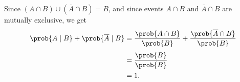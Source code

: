 Since $(A\cap B)\cup(\overline{A}\cap B)=B$, and since events $A\cap B$ and $\overline{A}\cap B$ are mutually exclusive, we get
\begin{align*}
    \prob{A\mid B}+\prob{\overline{A}\mid B} &= \frac{\prob{A\cap B}}{\prob{B}}+\frac{\prob{\overline{A}\cap B}}{\prob{B}} \\[1mm]
    &= \frac{\prob{B}}{\prob{B}} \\
    &= 1.
\end{align*}
